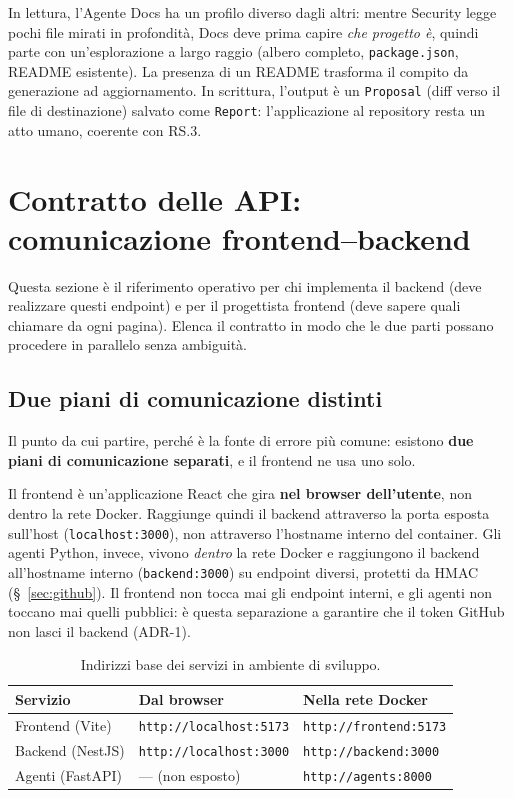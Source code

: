 \documentclass[11pt,a4paper]{article}
\begin{document}
In lettura, l'Agente Docs ha un profilo diverso dagli altri: mentre Security legge pochi file mirati in profondità, Docs deve prima capire \emph{che progetto è}, quindi parte con un'esplorazione a largo raggio (albero completo, \texttt{package.json}, README esistente). La presenza di un README trasforma il compito da generazione ad aggiornamento. In scrittura, l'output è un \texttt{Proposal} (diff verso il file di destinazione) salvato come \texttt{Report}: l'applicazione al repository resta un atto umano, coerente con RS.3.

\section{Contratto delle API: comunicazione frontend--backend}
\label{sec:api}

Questa sezione è il riferimento operativo per chi implementa il backend (deve realizzare questi endpoint) e per il progettista frontend (deve sapere quali chiamare da ogni pagina). Elenca il contratto in modo che le due parti possano procedere in parallelo senza ambiguità.

\subsection{Due piani di comunicazione distinti}

Il punto da cui partire, perché è la fonte di errore più comune: esistono \textbf{due piani di comunicazione separati}, e il frontend ne usa uno solo.

Il frontend è un'applicazione React che gira \textbf{nel browser dell'utente}, non dentro la rete Docker. Raggiunge quindi il backend attraverso la porta esposta sull'host (\texttt{localhost:3000}), non attraverso l'hostname interno del container. Gli agenti Python, invece, vivono \emph{dentro} la rete Docker e raggiungono il backend all'hostname interno (\texttt{backend:3000}) su endpoint diversi, protetti da HMAC (\S~\ref{sec:github}). Il frontend non tocca mai gli endpoint interni, e gli agenti non toccano mai quelli pubblici: è questa separazione a garantire che il token GitHub non lasci il backend (ADR-1).

\begin{table}[H]
\centering
\caption{Indirizzi base dei servizi in ambiente di sviluppo.}
\label{tab:indirizzi}
\vspace{2mm}
\renewcommand{\arraystretch}{1.2}
\begin{tabularx}{\textwidth}{|l|l|l|}
\hline
\textbf{Servizio} & \textbf{Dal browser} & \textbf{Nella rete Docker} \\ \hline
Frontend (Vite) & \texttt{http://localhost:5173} & \texttt{http://frontend:5173} \\ \hline
Backend (NestJS) & \texttt{http://localhost:3000} & \texttt{http://backend:3000} \\ \hline
Agenti (FastAPI) & --- (non esposto) & \texttt{http://agents:8000} \\ \hline
\end{tabularx}
\end{table}
\end{document}
